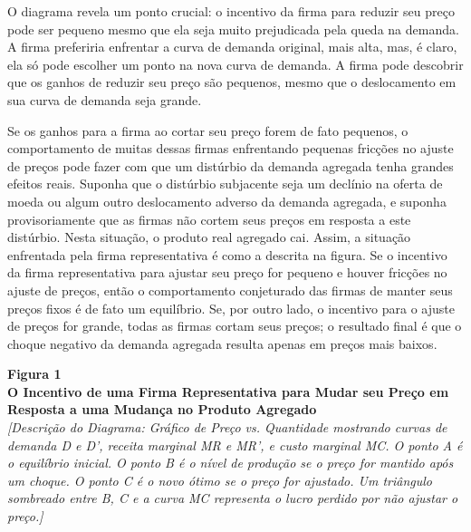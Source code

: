 \documentclass[12pt]{article}
\begin{document}
O diagrama revela um ponto crucial: o incentivo da firma para reduzir seu preço pode ser pequeno mesmo que ela seja muito prejudicada pela queda na demanda. A firma preferiria enfrentar a curva de demanda original, mais alta, mas, é claro, ela só pode escolher um ponto na nova curva de demanda. A firma pode descobrir que os ganhos de reduzir seu preço são pequenos, mesmo que o deslocamento em sua curva de demanda seja grande.

Se os ganhos para a firma ao cortar seu preço forem de fato pequenos, o comportamento de muitas dessas firmas enfrentando pequenas fricções no ajuste de preços pode fazer com que um distúrbio da demanda agregada tenha grandes efeitos reais. Suponha que o distúrbio subjacente seja um declínio na oferta de moeda ou algum outro deslocamento adverso da demanda agregada, e suponha provisoriamente que as firmas não cortem seus preços em resposta a este distúrbio. Nesta situação, o produto real agregado cai. Assim, a situação enfrentada pela firma representativa é como a descrita na figura. Se o incentivo da firma representativa para ajustar seu preço for pequeno e houver fricções no ajuste de preços, então o comportamento conjeturado das firmas de manter seus preços fixos é de fato um equilíbrio. Se, por outro lado, o incentivo para o ajuste de preços for grande, todas as firmas cortam seus preços; o resultado final é que o choque negativo da demanda agregada resulta apenas em preços mais baixos.

\begin{center}
\textbf{Figura 1} \\
\textbf{O Incentivo de uma Firma Representativa para Mudar seu Preço em Resposta a uma Mudança no Produto Agregado} \\
\textit{[Descrição do Diagrama: Gráfico de Preço vs. Quantidade mostrando curvas de demanda D e D', receita marginal MR e MR', e custo marginal MC. O ponto A é o equilíbrio inicial. O ponto B é o nível de produção se o preço for mantido após um choque. O ponto C é o novo ótimo se o preço for ajustado. Um triângulo sombreado entre B, C e a curva MC representa o lucro perdido por não ajustar o preço.]}
\end{center}
\end{document}
